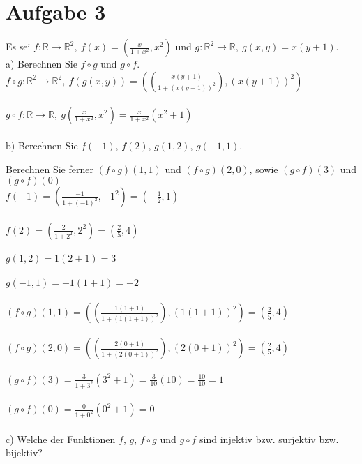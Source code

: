\section*{Aufgabe 3}

Es sei $f: \mathbb{R} \rightarrow \mathbb{R}^2, \ f(x) = (\frac{x}{1+x^2}, x^2)$ und $g: \mathbb{R}^2 \rightarrow \mathbb{R}, \ g(x,y) = x(y+1)$.\\

a) Berechnen Sie $f \circ g$ und $g \circ f$.\\

$f \circ g : \mathbb{R}^2 \rightarrow \mathbb{R}^2, \ f(g(x,y)) = ((\frac{x(y+1)}{1+(x(y+1))^2}), (x(y+1))^2)$\\~\\

$g \circ f : \mathbb{R} \rightarrow \mathbb{R}, \ g(\frac{x}{1+x^2},x^2) = \frac{x}{1+x^2}(x^2+1)$\\~\\

b) Berechnen Sie $f(-1)$, $f(2)$, $g(1,2)$, $g(-1,1)$.

\hspace{0.54cm}Berechnen Sie ferner $(f \circ g)(1,1)$ und $(f \circ g)(2,0)$, sowie $(g \circ f)(3)$ und $(g \circ f)(0)$\\

$f(-1) = (\frac{-1}{1+(-1)^2}, -1^2) = (- \frac{1}{2}, 1)$\\~\\

$f(2) = (\frac{2}{1+2^2}, 2^2) = (\frac{2}{5}, 4)$\\~\\

$g(1,2) = 1(2+1) = 3$\\~\\

$g(-1,1) = -1(1+1) = -2$\\~\\

$(f \circ g)(1,1) = ((\frac{1(1+1)}{1+(1(1+1))^2}), (1(1+1))^2) = (\frac{2}{5}, 4)$\\~\\

$(f \circ g)(2,0) = ((\frac{2(0+1)}{1+(2(0+1))^2}), (2(0+1))^2) = (\frac{2}{5}, 4)$\\~\\

$(g \circ f)(3) = \frac{3}{1+3^2}(3^2+1) = \frac{3}{10}(10) = \frac{10}{10} = 1$\\~\\

$(g \circ f)(0) = \frac{0}{1+0^2}(0^2+1) = 0$\\~\\

c) Welche der Funktionen $f$, $g$, $f \circ g$ und $g \circ f$ sind injektiv bzw. surjektiv bzw. bijektiv?

\newpage
